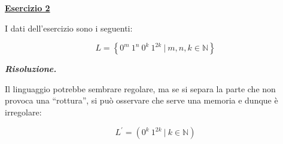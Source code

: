 \documentclass[a4paper]{article}
\newcommand{\dquotes}[1]{``#1''}
\begin{document}
	\newpage
	
	\noindent
	\textcolor{Red3}{\textbf{\underline{Esercizio 2}}}\newline
	
	\noindent
	I dati dell'esercizio sono i seguenti:
	
	\begin{equation*}
		L = \left\{0^{m} \: 1^{n} \: 0^{k} \: 1^{2k} \: \left| \: m,n,k \in \mathbb{N} \right.\right\}
	\end{equation*}\newline
	
	\noindent
	\textcolor{Green4}{\textbf{\emph{Risoluzione.}}}\newline
	
	\noindent
	Il linguaggio potrebbe sembrare regolare, ma se si separa la parte che non provoca una \dquotes{rottura}, si può osservare che serve una memoria e dunque è irregolare:
	
	\begin{equation*}
		L^{'} = \left(0^{k} \: 1^{2k} \: \left| \: k \in \mathbb{N} \right.\right)
	\end{equation*}
\end{document}
